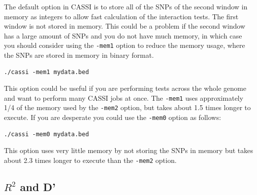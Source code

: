 \documentclass[a4paper,12pt]{article}
\newcommand{\code}[1]{{\footnotesize{{\tt #1}}}}
\begin{document}
The default option in CASSI is to store all of the SNPs of the second window in memory as integers to allow fast calculation of the interaction tests. The first window is not stored in memory. This could be a problem if the second window has a large amount of SNPs and you do not have much memory, in which case you should consider using the \code{-mem1} option to reduce the memory usage, where the SNPs are stored in memory in binary format. 
\vspace{0.35cm} \begin{lstlisting}
./cassi -mem1 mydata.bed

\end{lstlisting} \vspace{0.35cm}
This option could be useful if you are performing tests across the whole genome and want to perform many CASSI jobs at once. The \code{-mem1} uses approximately 1/4 of the memory used by the \code{-mem2} option, but takes about 1.5 times longer to execute. If you are desperate you could use the \code{-mem0} option as follows: 
\vspace{0.35cm} \begin{lstlisting}
./cassi -mem0 mydata.bed

\end{lstlisting} \vspace{0.35cm}
This option uses very little memory by not storing the SNPs in memory but takes about 2.3 times longer to execute than the \code{-mem2} option. 


\subsection{$R^2$ and D'}
\label{rsq}
\end{document}
